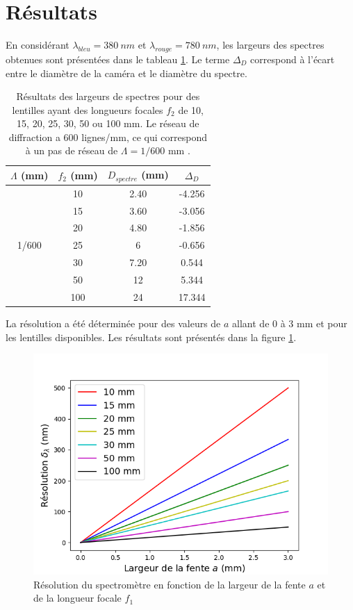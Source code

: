 \documentclass[conference]{IEEEtran}
\begin{document}
\section{Résultats \label{resultats}}
En considérant $\lambda_{bleu}=380\ nm$ et $\lambda_{rouge}=780\ nm$, les largeurs des spectres obtenues sont présentées
dans le tableau \ref{largeur_spectre}. Le terme $\Delta_D$ correspond à l'écart entre le diamètre de la caméra et le diamètre du spectre.
\begin{table}[H]
    \caption{Résultats des largeurs de spectres pour des lentilles ayant des longueurs focales
    $f_2$ de 10, 15, 20, 25, 30, 50 ou 100 mm. Le réseau de diffraction a 600 lignes/mm, ce qui correspond à un pas de réseau
    de $\Lambda=1/600$ mm \cite{grating}.}    
    \centering
    \begin{tabular}{c|c|c|c}
    $\Lambda$ (mm) & $f_2$ (mm) & $D_{spectre}$ (mm) & $\Delta_D$ \\
    \hline
    \hline
    \multirow{7}{*}{1/600} & 10 & 2.40 & -4.256 \\
    & 15 & 3.60 & -3.056 \\
    & 20 & 4.80 & -1.856 \\
    & 25 & 6 & -0.656 \\
    & 30 & 7.20 & 0.544 \\
    & 50 & 12 & 5.344 \\
    & 100 & 24 & 17.344\\
    \hline
    \end{tabular}
    \label{largeur_spectre}
\end{table}
La résolution a été déterminée pour des valeurs de $a$ allant de 0 à 3 mm et pour les lentilles
disponibles. Les résultats sont présentés dans la figure \ref{res}.
\begin{figure}[H]
    \centering
    \includegraphics[scale=0.5]{Resolution.png}
    \caption{Résolution du spectromètre en fonction de la largeur de la fente $a$ et de la longueur focale $f_1$}
    \label{res}
\end{figure}
\end{document}

